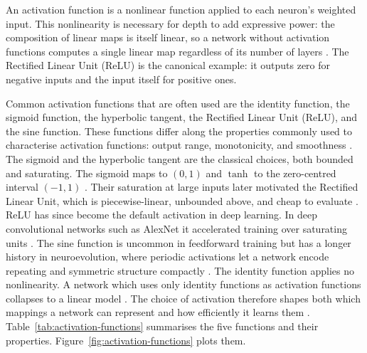 \documentclass[12pt]{article}
\begin{document}


An activation function is a nonlinear function applied to each neuron's weighted input. 
This nonlinearity is necessary for depth to add expressive power: the composition of linear maps is itself linear, 
so a network without activation functions computes a single linear map regardless of its number of layers \parencite{dubey_activation_2022}.
The Rectified Linear Unit (ReLU) \parencite{nair_rectified_2010} is the canonical example: it outputs zero for negative inputs and the input itself for positive ones.

Common activation functions that are often used are the identity function, the sigmoid function, the hyperbolic tangent, the Rectified Linear Unit (ReLU), and the sine function.
These functions differ along the properties commonly used to characterise activation functions: output range, monotonicity, and smoothness \parencite{dubey_activation_2022}.
The sigmoid and the hyperbolic tangent are the classical choices, both bounded and saturating. The sigmoid maps to $(0,1)$ and $\tanh$ to the zero-centred interval $(-1,1)$ \parencite{dubey_activation_2022}.
Their saturation at large inputs later motivated the Rectified Linear Unit, which is piecewise-linear, unbounded above, and cheap to evaluate \parencite{nair_rectified_2010}.
ReLU has since become the default activation in deep learning. In deep convolutional networks such as AlexNet it accelerated training over saturating units \parencite{krizhevsky_imagenet_2012,ramachandran_searching_2017}.
The sine function is uncommon in feedforward training but has a longer history in neuroevolution, where periodic activations let a network encode repeating and symmetric structure compactly \parencite{stanley_compositional_2007}.
The identity function applies no nonlinearity. A network which uses only identity functions as activation functions collapses to a linear model \parencite{dubey_activation_2022}.
The choice of activation therefore shapes both which mappings a network can represent and how efficiently it learns them \parencite{dubey_activation_2022}.
Table~\ref{tab:activation-functions} summarises the five functions and their properties. Figure~\ref{fig:activation-functions} plots them.
\end{document}
